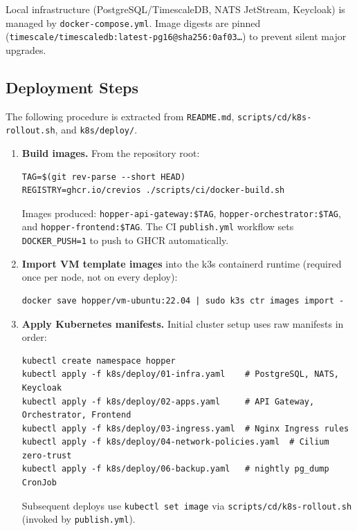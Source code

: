 \documentclass[12pt,a4paper]{article}
\begin{document}
\begin{sloppypar}
Local infrastructure (PostgreSQL/TimescaleDB, NATS JetStream, Keycloak) is
managed by \texttt{docker-compose.yml}. Image digests are pinned
(\texttt{timescale/timescaledb:latest-pg16@sha256:0af03\ldots}) to prevent
silent major upgrades.
\end{sloppypar}

\subsection{Deployment Steps}

The following procedure is extracted from \texttt{README.md},
\texttt{scripts/cd/k8s-rollout.sh}, and \texttt{k8s/deploy/}.

\begin{enumerate}[leftmargin=1.5em]
  \item \textbf{Build images.} From the repository root:
\begin{lstlisting}
TAG=$(git rev-parse --short HEAD)
REGISTRY=ghcr.io/crevios ./scripts/ci/docker-build.sh
\end{lstlisting}
        Images produced: \texttt{hopper-api-gateway:\$TAG},
        \texttt{hopper-orchestrator:\$TAG}, and \texttt{hopper-frontend:\$TAG}.
        The CI \texttt{publish.yml} workflow sets \texttt{DOCKER\allowbreak\_PUSH=1}
        to push to GHCR automatically.

  \item \textbf{Import VM template images} into the k3s containerd runtime
        (required once per node, not on every deploy):
\begin{lstlisting}
docker save hopper/vm-ubuntu:22.04 | sudo k3s ctr images import -
\end{lstlisting}

  \item \textbf{Apply Kubernetes manifests.}
        Initial cluster setup uses raw manifests in order:
\begin{lstlisting}
kubectl create namespace hopper
kubectl apply -f k8s/deploy/01-infra.yaml    # PostgreSQL, NATS, Keycloak
kubectl apply -f k8s/deploy/02-apps.yaml     # API Gateway, Orchestrator, Frontend
kubectl apply -f k8s/deploy/03-ingress.yaml  # Nginx Ingress rules
kubectl apply -f k8s/deploy/04-network-policies.yaml  # Cilium zero-trust
kubectl apply -f k8s/deploy/06-backup.yaml   # nightly pg_dump CronJob
\end{lstlisting}
        Subsequent deploys use \texttt{kubectl set image} via
        \texttt{scripts/cd/k8s-rollout.sh} (invoked by \texttt{publish.yml}).


\end{enumerate}
\end{document}
